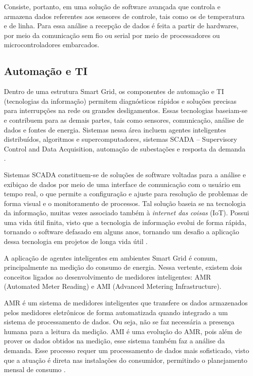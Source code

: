Consiste, portanto, em uma solução de software avançada que controla e armazena dados referentes aos sensores de controle, tais como os de temperatura e de linha. Para essa análise a recepção de dados é feita a partir de hardwares, por meio da comunicação sem fio ou serial por meio de processadores ou microcontroladores embarcados.


\subsection{Automação e TI}
Dentro de uma estrutura Smart Grid, os componentes de automação e TI (tecnologias da informação) permitem diagnósticos rápidos e soluções precisas para interrupções na rede ou grandes desligamentos. Essas tecnologias baseiam-se e contribuem para as demais partes, tais como sensores, comunicação, análise de dados e fontes de energia. Sistemas nessa área incluem agentes inteligentes distribuídos, algoritmos e supercomputadores, sistemas SCADA – Supervisory Control and Data Acquisition, automação de subestações e resposta da demanda \cite{josesmartgrid}.

Sistemas SCADA constituem-se de soluções de software voltadas para a análise e exibiçao de dados por meio de uma interface de comunicação com o usuário em tempo real, o que permite a configuração e ajuste para resolução de problemas de forma visual e o monitoramento de processos. Tal solução baseia se na tecnologia da informação, muitas vezes associado também à \textit{internet das coisas} (IoT). Possui uma vida útil finita, visto que a tecnologia de informação evolui de forma rápida, tornando o software defasado em alguns anos, tornando um desafio a aplicação dessa tecnologia em projetos de longa vida útil \cite{galloway2013introduction}.

A aplicação de agentes inteligentes em ambientes Smart Grid é comum, principalmente na medição do consumo de energia. Nessa vertente, existem dois conceitos ligados ao desenvolvimento de medidores inteligentes: AMR (Automated Meter Reading) e AMI (Advanced Metering Infrastructure).

AMR é um sistema de medidores inteligentes que transfere os dados armazenados pelos medidores eletrônicos de forma automatizada quando integrado a um sistema de processamento de dados. Ou seja, não se faz necessária a presença humana para a leitura da medição. AMI é uma evolução do AMR, pois além de prover os dados obtidos na medição, esse sistema também faz a análise da demanda. Esse processo requer um processamento de dados mais sofisticado, visto que a atuação é direta nas instalações do consumidor, permitindo o planejamento mensal de consumo \cite{kup2015estudo}.



